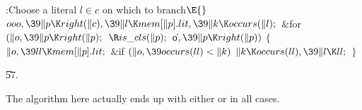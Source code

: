 \Y\B\4:Choose a literal $l\in c$ on which to branch\X${}\E{}$\6
$\\{ooo},\39\|p\K\\{right}(\|c),\39\|l\K\\{mem}[\|p].\\{lit},\39\|k\K%
\\{occurs}(\|l);{}$\6
\&{for} ${}(\|o,\39\|p\K\\{right}(\|p);{}$ ${}\R\\{is\_cls}(\|p);{}$ \|o${},\39%
\|p\K\\{right}(\|p)){}$\5
${}\{{}$\1\6
${}\|o,\39\\{ll}\K\\{mem}[\|p].\\{lit};{}$\6
\&{if} ${}(\|o,\39\\{occurs}(\\{ll})<\|k){}$\1\5
${}\|k\K\\{occurs}(\\{ll}),\39\|l\K\\{ll};{}$\2\6
\4${}\}{}$\2\par
\U57.\fi

The algorithm here actually ends up with either  or 
in all cases.

